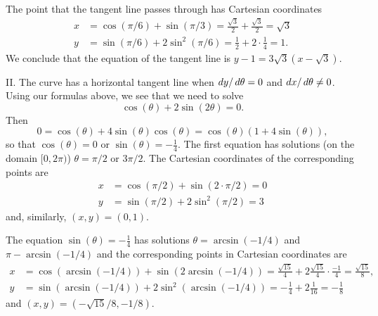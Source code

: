 \documentclass[noauthor,handout]{ximera}
\begin{document}
\begin{problem}
\begin{freeResponse}
The point that the tangent line passes through has Cartesian coordinates
\begin{align*}
x &= \cos(\pi/6) + \sin (\pi/3) = \frac{\sqrt{3}}{2} + \frac{\sqrt{3}}{2} = \sqrt{3} \\
y &= \sin(\pi/6) + 2 \sin^2(\pi/6) = \frac{1}{2} + 2 \cdot \frac{1}{4} = 1.
\end{align*}
We conclude that the equation of the tangent line is $y-1 = 3 \sqrt{3}(x-\sqrt{3})$.

II. The curve has a horizontal tangent line when $\mathop{}\!d y/ \mathop{}\!d \theta = 0$ and $\mathop{}\!d x /\mathop{}\!d \theta \neq 0$. Using our formulas above, we see that we need to solve
$$
\cos(\theta) + 2 \sin(2 \theta) = 0.
$$
Then 
$$
0 = \cos(\theta) + 4 \sin(\theta) \cos(\theta) = \cos(\theta) ( 1+ 4 \sin(\theta)),
$$
so that $\cos(\theta) = 0$ or $\sin(\theta) = - \frac{1}{4}$. The first equation has solutions (on the domain $[0,2\pi)$) $\theta = \pi/2$ or $3\pi/2$. The Cartesian coordinates of the corresponding points are
\begin{align*}
x &= \cos (\pi/2) + \sin(2 \cdot \pi/2) = 0\\
y &= \sin(\pi/2) + 2 \sin^2(\pi/2) = 3
\end{align*}
and, similarly, $(x,y) = (0,1)$. 

The equation $\sin(\theta) = -\frac{1}{4}$ has solutions $\theta = \arcsin (-1/4)$ and $\pi - \arcsin(-1/4)$ and the corresponding points in Cartesian coordinates are
\begin{align*}
x &= \cos (\arcsin(-1/4)) + \sin (2 \arcsin(-1/4)) = \frac{\sqrt{15}}{4} + 2 \frac{\sqrt{15}}{4} \cdot \frac{-1}{4} = \frac{\sqrt{15}}{8}, \\
y &= \sin(\arcsin(-1/4)) + 2 \sin^2 (\arcsin(-1/4)) = -\frac{1}{4} + 2 \frac{1}{16} = -\frac{1}{8}
\end{align*}
and $(x,y) = (-\sqrt{15}/8,-1/8)$. 
\end{freeResponse}
\end{problem}
\end{document}
